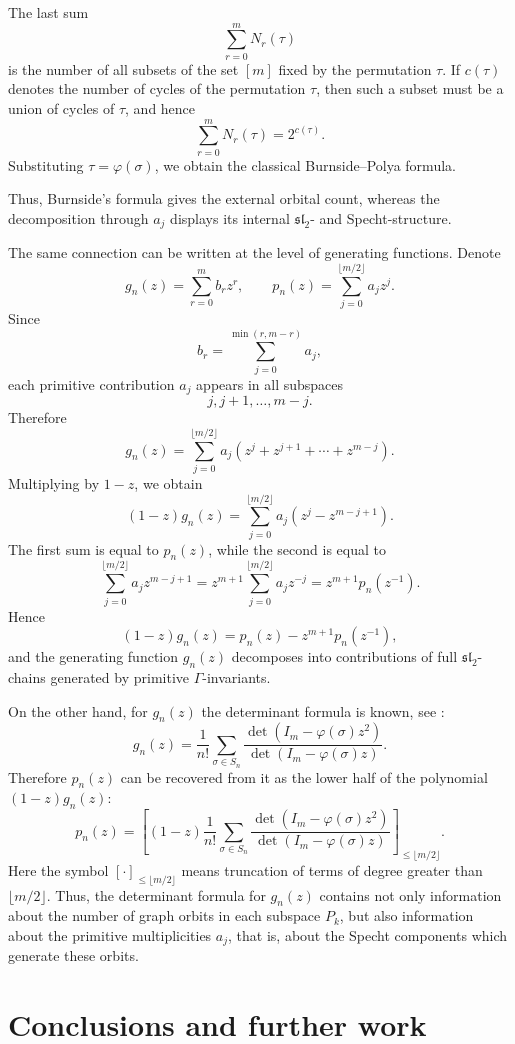 \documentclass[12pt,reqno]{amsart}
\begin{document}
The last sum
$$
\sum_{r=0}^{m}N_r(\tau)
$$
is the number of all subsets of the set \([m]\) fixed by the permutation
\(\tau\). If \(c(\tau)\) denotes the number of cycles of the permutation
\(\tau\), then such a subset must be a union of cycles of \(\tau\), and hence
$$
\sum_{r=0}^{m}N_r(\tau)=2^{c(\tau)}.
$$
Substituting \(\tau=\varphi(\sigma)\), we obtain the classical
Burnside--Polya formula.

Thus, Burnside's formula gives the external orbital count, whereas the
decomposition through \(a_j\) displays its internal \(\mathfrak{sl}_2\)- and
Specht-structure.

The same connection can be written at the level of generating functions.
Denote
$$
g_n(z)=\sum_{r=0}^{m} b_r z^r,
\qquad
p_n(z)=\sum_{j=0}^{\lfloor m/2\rfloor} a_jz^j.
$$
Since
$$
b_r=\sum_{j=0}^{\min(r,m-r)}a_j,
$$
each primitive contribution \(a_j\) appears in all subspaces
$$
j,j+1,\dots,m-j.
$$
Therefore
$$
g_n(z)
=
\sum_{j=0}^{\lfloor m/2\rfloor}
a_j(z^j+z^{j+1}+\cdots+z^{m-j}).
$$
Multiplying by \(1-z\), we obtain
$$
(1-z)g_n(z)
=
\sum_{j=0}^{\lfloor m/2\rfloor}
a_j(z^j-z^{m-j+1}).
$$
The first sum is equal to \(p_n(z)\), while the second is equal to
$$
\sum_{j=0}^{\lfloor m/2\rfloor}a_jz^{m-j+1}
=
z^{m+1}\sum_{j=0}^{\lfloor m/2\rfloor}a_jz^{-j}
=
z^{m+1}p_n(z^{-1}).
$$
Hence
$$
(1-z)g_n(z)
=
p_n(z)-z^{m+1}p_n(z^{-1}),
$$
and the generating function \(g_n(z)\) decomposes into contributions of full
\(\mathfrak{sl}_2\)-chains generated by primitive \(\Gamma\)-invariants.

On the other hand, for \(g_n(z)\) the determinant formula is known, see
\cite{BB2016}:
$$
g_n(z)
=
\frac1{n!}
\sum_{\sigma\in S_n}
\frac{\det(I_m-\varphi(\sigma) z^2)}
     {\det(I_m-\varphi(\sigma) z)}.
$$
Therefore \(p_n(z)\) can be recovered from it as the lower half of the
polynomial
$
(1-z)g_n(z):
$
$$
p_n(z)
=
\left[
(1-z)
\frac1{n!}
\sum_{\sigma\in S_n}
\frac{\det(I_m-\varphi(\sigma) z^2)}
     {\det(I_m-\varphi(\sigma) z)}
\right]_{\le \lfloor m/2\rfloor}.
$$
Here the symbol \([\cdot]_{\le \lfloor m/2\rfloor}\) means truncation of
terms of degree greater than \(\lfloor m/2\rfloor\). Thus, the determinant
formula for \(g_n(z)\) contains not only information about the number of graph
orbits in each subspace \(P_k\), but also information about the primitive
multiplicities \(a_j\), that is, about the Specht components which generate
these orbits.

\section{Conclusions and further work}
\end{document}
